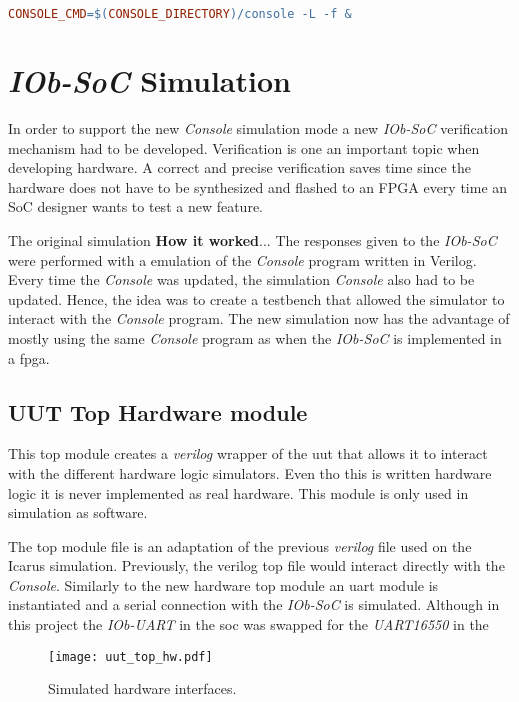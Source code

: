 \begin{lstlisting}[language=make, caption={Call \textit{Console} program}, label=lst:call_console]
    CONSOLE_CMD=$(CONSOLE_DIRECTORY)/console -L -f &
\end{lstlisting}

\section{\textit{IOb-SoC} Simulation}
\label{section:simulation}
In order to support the new \textit{Console} simulation mode a new \textit{IOb-SoC} verification mechanism had to be developed. Verification is one an important topic when developing hardware. A correct and precise verification saves time since the hardware does not have to be synthesized and flashed to an FPGA every time an SoC designer wants to test a new feature.

The original simulation \textbf{How it worked}... The responses given to the \textit{IOb-SoC} were performed with a emulation of the \textit{Console} program written in Verilog. Every time the \textit{Console} was updated, the simulation \textit{Console} also had to be updated. Hence, the idea was to create a testbench that allowed the simulator to interact with the \textit{Console} program. The new simulation now has the advantage of mostly using the same \textit{Console} program as when the \textit{IOb-SoC} is implemented in a \acrshort{fpga}.

\subsection{UUT Top Hardware module}
This top module creates a \textit{verilog} wrapper of the \acrfull{uut} that allows it to interact with the different hardware logic simulators. Even tho this is written hardware logic it is never implemented as real hardware. This module is only used in simulation as software.

The top module file is an adaptation of the previous \textit{verilog} file used on the Icarus simulation. Previously, the verilog top file would interact directly with the \textit{Console}. Similarly to the new hardware top module an \acrshort{uart} module is instantiated and a serial connection with the \textit{IOb-SoC} is simulated. Although in this project the \textit{IOb-UART} in the \acrfull{soc} was swapped for the \textit{UART16550} in the 

\begin{figure}[!ht]
    \centering
    \texttt{[image: uut\_top\_hw.pdf]}
    \caption{Simulated hardware interfaces.}
    \label{fig:uut_top_hw}
\end{figure}

